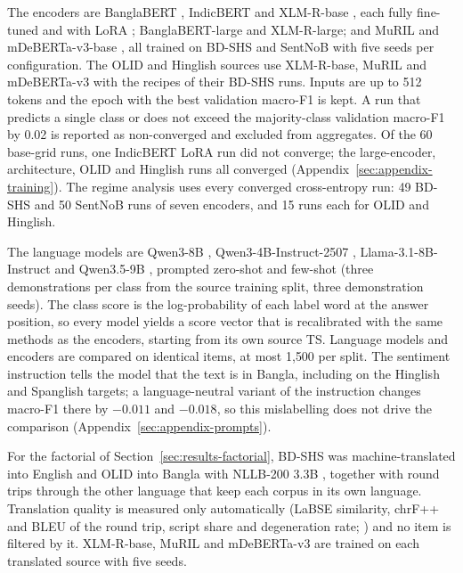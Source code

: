 The encoders are BanglaBERT \citep{bhattacharjee2022banglabert}, IndicBERT \citep{kakwani2020indicnlpsuite} and
XLM-R-base \citep{conneau2020xlmr}, each fully fine-tuned and with LoRA \citep{hu2022lora}; BanglaBERT-large and
XLM-R-large; and MuRIL \citep{khanuja2021muril} and mDeBERTa-v3-base \citep{he2023debertav3}, all trained on BD-SHS and
SentNoB with five seeds per configuration. The OLID and Hinglish sources use XLM-R-base, MuRIL and mDeBERTa-v3 with the
recipes of their BD-SHS runs. Inputs are up to 512 tokens and the epoch with the best validation macro-F1 is kept. A
run that predicts a single class or does not exceed the majority-class validation macro-F1 by 0.02 is reported as
non-converged and excluded from aggregates. Of the 60 base-grid runs, one IndicBERT LoRA run did not converge; the
large-encoder, architecture, OLID and Hinglish runs all converged (Appendix~\ref{sec:appendix-training}). The regime
analysis uses every converged cross-entropy run: 49 BD-SHS and 50 SentNoB runs of seven encoders, and 15 runs each for
OLID and Hinglish.

The language models are Qwen3-8B \citep{qwen3}, Qwen3-4B-Instruct-2507 \citep{qwen34b2507}, Llama-3.1-8B-Instruct
\citep{llama3} and Qwen3.5-9B \citep{qwen35}, prompted zero-shot and few-shot (three demonstrations per class from the
source training split, three demonstration seeds). The class score is the log-probability of each label word at the
answer position, so every model yields a score vector that is recalibrated with the same methods as the encoders,
starting from its own source TS. Language models and encoders are compared on identical items, at most 1{,}500 per
split. The sentiment instruction tells the model that the text is in Bangla, including on the Hinglish and Spanglish
targets; a language-neutral variant of the instruction changes macro-F1 there by $-0.011$ and $-0.018$, so this
mislabelling does not drive the comparison (Appendix~\ref{sec:appendix-prompts}).

For the factorial of Section~\ref{sec:results-factorial}, BD-SHS was machine-translated into English and OLID into
Bangla with NLLB-200 3.3B \citep{nllbteam2024scaling}, together with round trips through the other language that keep each corpus
in its own language. Translation quality is measured only automatically (LaBSE similarity, chrF++ and BLEU of the round
trip, script share and degeneration rate; \citealp{feng2022labse, popovic2017chrf, post2018call}) and no item is
filtered by it. XLM-R-base, MuRIL and mDeBERTa-v3 are trained on each translated source with five seeds.

